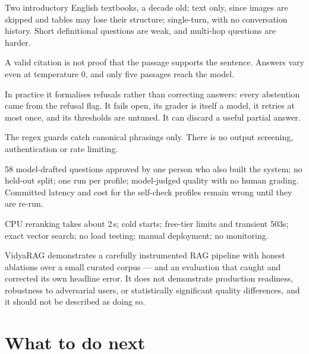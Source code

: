 \begin{description}[style=nextline]
  \item[Scope.] Two introductory English textbooks, a decade old; text only, since images are skipped and tables may lose their structure; single-turn, with no conversation history. Short definitional questions are weak, and multi-hop questions are harder.
  \item[Answers.] A valid citation is not proof that the passage supports the sentence. Answers vary even at temperature 0, and only five passages reach the model.
  \item[The self-check.] In practice it formalises refusals rather than correcting answers: every abstention came from the refusal flag. It fails open, its grader is itself a model, it retries at most once, and its thresholds are untuned. It can discard a useful partial answer.
  \item[Safety.] The regex guards catch canonical phrasings only. There is no output screening, authentication or rate limiting.
  \item[Evaluation.] 58 model-drafted questions approved by one person who also built the system; no held-out split; one run per profile; model-judged quality with no human grading. Committed latency and cost for the self-check profiles remain wrong until they are re-run.
  \item[Operations.] CPU reranking takes about 2\,s; cold starts; free-tier limits and transient 503s; exact vector search; no load testing; manual deployment; no monitoring.
\end{description}

\begin{inferred}
VidyaRAG demonstrates a carefully instrumented RAG pipeline with honest ablations over a small curated corpus --- and an evaluation that caught and corrected its own headline error. It does not demonstrate production readiness, robustness to adversarial users, or statistically significant quality differences, and it should not be described as doing so.
\end{inferred}

\section{What to do next}
\label{sec:improvements}

